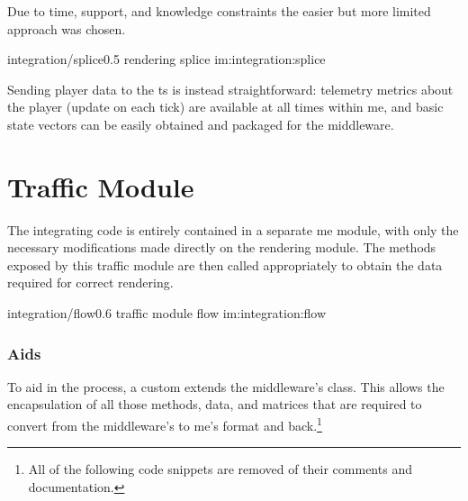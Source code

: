 Due to time, support, and knowledge constraints the easier but more limited approach was chosen.

\begin{image}
	{integration/splice}{0.5}
	{rendering splice}
	{im:integration:splice}
	{}
\end{image}

Sending player data to the \gls{ts} is instead straightforward: telemetry metrics about the player (update on each tick) are available at all times within \gls{me}, and basic state vectors can be easily obtained and packaged for the \gls{middleware}.

\section{Traffic Module}\label{sc:integration:trafficmodule}

The integrating code is entirely contained in a separate \gls{me} module, with only the necessary modifications made directly on the rendering module. The methods exposed by this traffic module are then called appropriately to obtain the data required for correct rendering.

\begin{image}
	{integration/flow}{0.6}
	{traffic module flow}
	{im:integration:flow}
	{}
\end{image}

\subsubsection{Aids}

To aid in the process, a custom  extends the \gls{middleware}'s  class. This allows the encapsulation of all those methods, data, and matrices that are required to convert from the \gls{middleware}'s to \gls{me}'s format and back.\footnote{All of the following code snippets are removed of their comments and documentation.}

